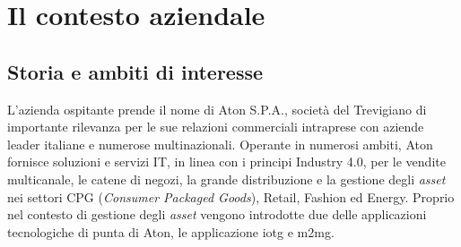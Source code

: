 
\chapter{Il contesto aziendale}
\label{cap:introduzione}






\section{Storia e ambiti di interesse}

L'azienda ospitante prende il nome di Aton S.P.A., società del Trevigiano di importante rilevanza per le sue relazioni commerciali intraprese con
aziende leader italiane e numerose multinazionali.
Operante in numerosi ambiti, Aton fornisce soluzioni e servizi IT, in linea con i principi Industry 4.0, per le vendite multicanale, le catene di negozi, 
la grande distribuzione e la gestione degli \emph{asset} nei settori CPG (\emph{Consumer Packaged Goods}), Retail, Fashion ed Energy.
Proprio nel contesto di gestione degli \emph{asset} vengono introdotte due delle applicazioni tecnologiche di punta di Aton, le applicazione \gls{iotg} e \gls{m2mg}.


